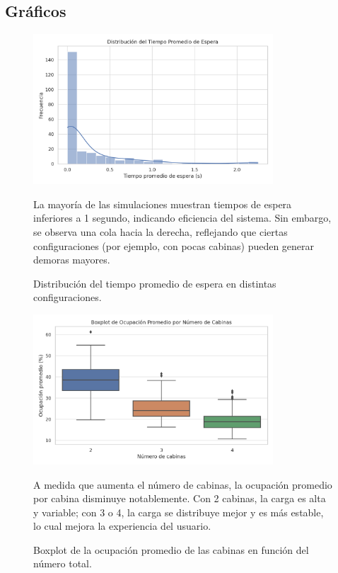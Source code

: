 \documentclass[12pt]{article}
\begin{document}
\subsection*{Gráficos}
\begin{figure}[H]
\centering\vspace{-0.5em}
\includegraphics[width=0.8\textwidth]{hist_espera.png}
\caption{Distribución del tiempo promedio de espera en distintas configuraciones.}
\small La mayoría de las simulaciones muestran tiempos de espera inferiores a 1 segundo, indicando eficiencia del sistema. Sin embargo, se observa una cola hacia la derecha, reflejando que ciertas configuraciones (por ejemplo, con pocas cabinas) pueden generar demoras mayores.

\end{figure}

\begin{figure}[H]
\centering\vspace{-0.5em}
\includegraphics[width=0.8\textwidth]{box_ocupacion.png}
\caption{Boxplot de la ocupación promedio de las cabinas en función del número total.}
\small A medida que aumenta el número de cabinas, la ocupación promedio por cabina disminuye notablemente. Con 2 cabinas, la carga es alta y variable; con 3 o 4, la carga se distribuye mejor y es más estable, lo cual mejora la experiencia del usuario.
\end{figure}
\end{document}
